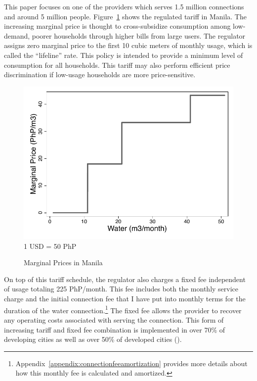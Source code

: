 \documentclass[12pt]{article}
\begin{document}
This paper focuses on one of the providers which serves 1.5 million connections and around 5 million people.  Figure~\ref{figure:tariff} shows the regulated tariff in Manila.  The increasing marginal price is thought to cross-subsidize consumption among low-demand, poorer households through higher bills from large users.  The regulator assigns zero marginal price to the first 10 cubic meters of monthly usage, which is called the ``lifeline'' rate.  This policy is intended to provide a minimum level of consumption for all households.  This tariff may also perform efficient price discrimination if low-usage households are more price-sensitive.
\begin{figure}
\centering
\caption{Marginal Prices in Manila}\label{figure:tariff}
\begin{center}
\includegraphics[scale=.7]{tables/tariff_structure.pdf}\\
\footnotesize{1 USD = 50 PhP}
\end{center}
\end{figure}
On top of this tariff schedule, the regulator also charges a fixed fee independent of usage totaling 225 PhP/month.  This fee includes both the monthly service charge and the initial connection fee that I have put into monthly terms for the duration of the water connection.\footnote{Appendix~\ref{appendix:connectionfeeamortization} provides more details about how this monthly fee is calculated and amortized.}  The fixed fee allows the provider to recover any operating costs associated with serving the connection.  This form of increasing tariff and fixed fee combination is implemented in over 70\% of developing cities as well as over 50\% of developed cities (\cite{hoque2013state}).
\end{document}
